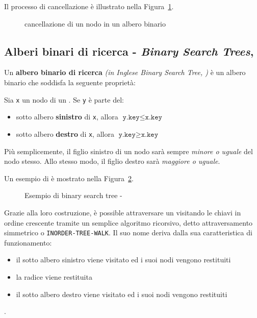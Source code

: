 \documentclass[italian, 10pt]{article}
\begin{document}
\bigskip
Il processo di cancellazione è illustrato nella Figura~\ref{fig:cancellazione-albero-binario}.

\begin{figure}[htbp]
  \bigskip
  \centering
  \caption{cancellazione di un nodo in un albero binario}
  \label{fig:cancellazione-albero-binario}
  \bigskip
\end{figure}

\subsection{Alberi binari di ricerca - \textit{Binary Search Trees}, \BST}

Un \textbf{albero binario di ricerca} \textit{(in Inglese Binary Search Tree, \BST)} è un albero binario che soddisfa la seguente proprietà:

Sia \texttt{x} un nodo di un \BST.
Se \texttt{y} è parte del:

\begin{itemize}
  \item sotto albero \textbf{sinistro} di \texttt{x}, allora \(\texttt{y.key} \leq \texttt{x.key}\)
  \item sotto albero \textbf{destro} di \texttt{x}, allora \(\texttt{y.key} \geq \texttt{x.key}\)
\end{itemize}

Più semplicemente, il figlio sinistro di un nodo sarà sempre \textit{minore o uguale} del nodo stesso.
Allo stesso modo, il figlio destro sarà \textit{maggiore o uguale}.

\bigskip
Un esempio di \BST è mostrato nella Figura~\ref{fig:esempio-bst}.

\begin{figure}[htbp]
  \bigskip
  \centering
  \caption{Esempio di binary search tree - \BST}
  \label{fig:esempio-bst}
  \bigskip
\end{figure}

\bigskip
Grazie alla loro costruzione, è possible attraversare un \BST visitando le chiavi in ordine crescente tramite un semplice algoritmo ricorsivo, detto attraversamento simmetrico o \texttt{INORDER-TREE-WALK}.
Il suo nome deriva dalla sua caratteristica di funzionamento:

\begin{itemize}
  \item il sotto albero sinistro viene visitato ed i suoi nodi vengono restituiti
  \item la radice viene restituita
  \item il sotto albero destro viene visitato ed i suoi nodi vengono restituiti
\end{itemize}.
\end{document}

